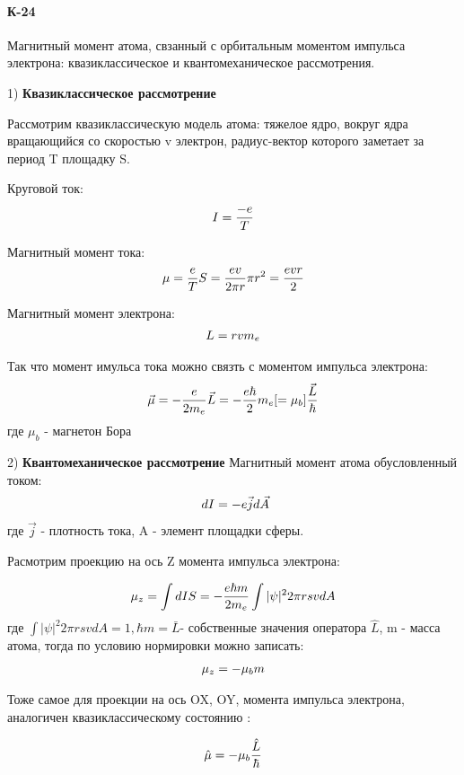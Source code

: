 \documentclass[__main__.tex]{subfiles}
\begin{document}
\paragraph{К-24}
Магнитный момент атома, свзанный с орбитальным моментом импульса электрона: квазиклассическое и квантомеханическое рассмотрения.

1) \textbf{Квазиклассическое рассмотрение}

Рассмотрим квазиклассическую модель атома: тяжелое ядро, вокруг ядра вращающийся со скоростью v электрон, радиус-вектор которого заметает за период T площадку S. 

Круговой ток:
\begin{gather}
\llabel{K24/1}
I=\frac{-e}{T} 
\end{gather}

Магнитный момент тока:
\begin{gather}
\llabel{K24/2}
 \mu=\frac{e}{T}S=\frac{ev}{2\pi r}\pi r^{2}= \frac{evr}{2} 
\end{gather}

Магнитный момент электрона:
\begin{gather}
\llabel{K24/3}
 L= r v m_{e} 
\end{gather}

Так что момент имульса тока можно связть с моментом импульса электрона:
\begin{gather}
\llabel{K24/4}
 \vec{\mu}= -\frac{e}{2m_{e}}\vec{L}= -\frac{e\hbar}{2} m_{e}[=\mu_{b}]\frac{\vec{L}}{\hbar} 
\end{gather}
 где $\mu_{b}$ - магнетон Бора
 
 2) \textbf{Квантомеханическое рассмотрение}
 Магнитный момент атома обусловленный током:
 \begin{gather}
 \llabel{K24/5}
  \ dI=-e\vec{j}d\vec{A}
 \end{gather}
 где $\vec{j}$ - плотность тока, A - элемент площадки сферы.
 
 Расмотрим проекцию на ось Z момента импульса электрона:
 
 \begin{gather}
 \llabel{K24/6}
 \mu_{z}=\int dI S= -\frac{e\hbar m}{2m_e} \int |\psi|^2 2 \pi r s v dA 
 \end{gather}
  где  $\int |\psi|^2 2 \pi r s v dA=1, \hbar m = \bar{L}$- собственные значения оператора $\hat{L}$,  m - масса атома, тогда  по условию нормировки
   можно записать:
   \begin{gather}
  \llabel{K24/7}
 \mu_{z} = -\mu_{b}m 
  \end{gather}
  
  Тоже самое для проекции на ось OX, OY,  момента импульса электрона, аналогичен квазиклассическому состоянию  :
  
  \begin{gather}
  \llabel{K24/8}
  \hat{\mu}=-\mu_{b}\frac{\hat{L}}{\hbar}
  \end{gather}
\end{document}
